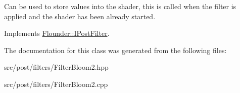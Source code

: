 Can be used to store values into the shader, this is called when the filter is applied and the shader has been already started. 



Implements \hyperlink{class_flounder_1_1_i_post_filter_a20420ec0a9bac67437740552bea9ab74}{Flounder\+::\+I\+Post\+Filter}.



The documentation for this class was generated from the following files\+:\begin{DoxyCompactItemize}
\item 
src/post/filters/Filter\+Bloom2.\+hpp\item 
src/post/filters/Filter\+Bloom2.\+cpp\end{DoxyCompactItemize}
